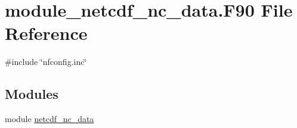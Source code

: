\hypertarget{module__netcdf__nc__data_8F90}{}\section{module\+\_\+netcdf\+\_\+nc\+\_\+data.\+F90 File Reference}
\label{module__netcdf__nc__data_8F90}
{\ttfamily \#include \char`\"{}nfconfig.\+inc\char`\"{}}\newline
\subsection*{Modules}
\begin{DoxyCompactItemize}
\item 
module \hyperlink{namespacenetcdf__nc__data}{netcdf\+\_\+nc\+\_\+data}
\end{DoxyCompactItemize}
